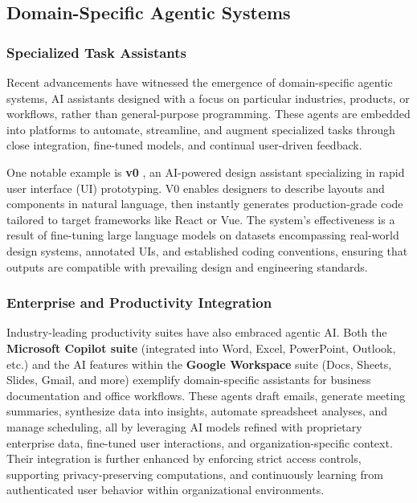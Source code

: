 \subsection{Domain-Specific Agentic Systems}

\subsubsection{Specialized Task Assistants}
Recent advancements have witnessed the emergence of domain-specific agentic systems, AI assistants designed with a focus on particular industries, products, or workflows, rather than general-purpose programming. These agents are embedded into platforms to automate, streamline, and augment specialized tasks through close integration, fine-tuned models, and continual user-driven feedback.

One notable example is \textbf{v0} \cite{v0}, an AI-powered design assistant specializing in rapid user interface (UI) prototyping. V0 enables designers to describe layouts and components in natural language, then instantly generates production-grade code tailored to target frameworks like React or Vue. The system’s effectiveness is a result of fine-tuning large language models on datasets encompassing real-world design systems, annotated UIs, and established coding conventions, ensuring that outputs are compatible with prevailing design and engineering standards.

\subsubsection{Enterprise and Productivity Integration}
Industry-leading productivity suites have also embraced agentic AI. Both the \textbf{Microsoft Copilot suite} \cite{microsoftCopilot} (integrated into Word, Excel, PowerPoint, Outlook, etc.) and the AI features within the \textbf{Google Workspace} \cite{googleWorkspace} suite (Docs, Sheets, Slides, Gmail, and more) exemplify domain-specific assistants for business documentation and office workflows. These agents draft emails, generate meeting summaries, synthesize data into insights, automate spreadsheet analyses, and manage scheduling, all by leveraging AI models refined with proprietary enterprise data, fine-tuned user interactions, and organization-specific context. Their integration is further enhanced by enforcing strict access controls, supporting privacy-preserving computations, and continuously learning from authenticated user behavior within organizational environments.

